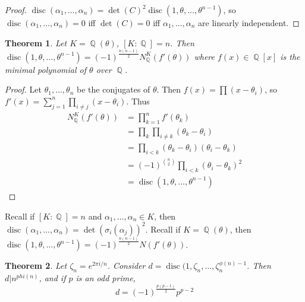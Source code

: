 \documentclass[11pt, a4paper]{memoir}
\DeclareMathOperator{\Q}{{\mathbb{Q}}}
\theoremstyle{change}
\newtheorem{theorem}{Theorem}[section]
\theoremstyle{plain}
\theoremstyle{nonumberplain}
\newtheorem{proof}{Proof}
\DeclareMathOperator{\disc}{disc}
\begin{document}
\begin{proof}
    $\disc(\alpha_1,\ldots,\alpha_n)=\det(C)^2\disc(1,\theta,\ldots,\theta^{n-1})$, so $\disc(\alpha_1,\ldots,\alpha_n)=0$ iff $\det(C)=0$ iff $\alpha_1,\ldots,\alpha_n$ are linearly independent.
\end{proof}
\begin{theorem}
    Let $K=\Q(\theta)$, $[K:\Q]=n$.
    Then $\disc(1,\theta,\ldots,\theta^{n-1})=(-1)^\frac{n(n-1)}{2}N_{\Q}^K(f'(\theta))$ where $f(x)\in\Q[x]$ is the minimal polynomial of $\theta$ over $\Q$.
\end{theorem}
\begin{proof}
    Let $\theta_1,\ldots,\theta_n$ be the conjugates of $\theta$.
    Then $f(x)=\prod(x-\theta_i)$, so $f'(x)=\sum_{j=1}^n\prod_{i\neq j}(x-\theta_i)$.
    Thus
    \begin{align*}
        N_{\Q}^K(f'(\theta))&=\prod_{k=1}^nf'(\theta_k)\\
                          &= \prod_k\prod_{i\neq k}(\theta_k-\theta_i)\\
                          &= \prod_{i<k}(\theta_k-\theta_i)(\theta_i-\theta_k)\\
                          &= (-1)^{\binom{n}{2}}\prod_{i<k}(\theta_i-\theta_k)^2\\
                          &= \disc(1,\theta,\ldots,\theta^{n-1})
    \end{align*}
\end{proof}
Recall if $[K:\Q]=n$ and $\alpha_1,\ldots,\alpha_n\in K$, then $\disc(\alpha_1,\ldots,\alpha_n)=\det(\sigma_i(\alpha_j))^2$.
Recall if $K=\Q(\theta)$, then $\disc(1,\theta,\ldots,\theta^{n-1})=(-1)^{\frac{n(n-1)}{2}}N(f'(\theta))$.
\begin{theorem}
    Let $\zeta_n=e^{2\pi i/n}$.
    Consider $d=\disc(1,\zeta_n,\ldots,\zeta_n^{\phi(n)-1}$.
    Then $d|n^{phi(n)}$, and if $p$ is an odd prime,
    \begin{equation*}
        d=(-1)^{\frac{p(p-1)}{2}}p^{p-2}
    \end{equation*}
\end{theorem}
\end{document}
